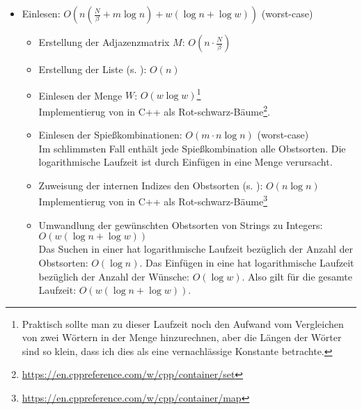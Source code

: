 \begin{itemize}
  \item Einlesen: $O(n (\frac{N}{\beta} + m \log n) + w (\log n + \log w))$ (worst-case)
  \begin{itemize}
    \item Erstellung der Adjazenzmatrix $M$: $O(n \cdot \frac{N}{\beta})$

    \item Erstellung der Liste  (s. ): $O(n)$

    \item Einlesen der Menge $W$: $O(w \log w)$\footnote{Praktisch sollte man zu dieser Laufzeit noch den Aufwand vom Vergleichen von zwei Wörtern in der Menge hinzurechnen, aber die Längen der Wörter sind so klein, dass
     ich dies als eine vernachlässige Konstante betrachte.\label{foot:vergleich-aufwand}}\\
     Implementierug von  in C++ als Rot-schwarz-Bäume\footnote{\href{https://en.cppreference.com/w/cpp/container/set}{https://en.cppreference.com/w/cpp/container/set}}.

    \item Einlesen der Spießkombinationen: $O(m \cdot n \log n)$ (worst-case)\\
    Im schlimmsten Fall enthält jede Spießkombination alle Obstsorten.
    Die logarithmische Laufzeit ist durch Einfügen in eine Menge verursacht.

    \item Zuweisung der internen Indizes den Obstsorten (s. ): $O(n \log n)$\\
     Implementierug von  in C++ als Rot-schwarz-Bäume\footnote{\href{https://en.cppreference.com/w/cpp/container/map}{https://en.cppreference.com/w/cpp/container/map}}

    \item Umwandlung der gewünschten Obstsorten von Strings zu Integers: $O(w (\log n + \log w))$\\%
    Das Suchen in einer  hat logarithmische Laufzeit bezüglich der Anzahl
    der Obstsorten: $O(\log n)$.
    Das Einfügen in eine  hat logarithmische Laufzeit bezüglich der Anzahl
    der Wünsche: $O(\log w)$. Also gilt für die gesamte Laufzeit: $O(w (\log n + \log w))$. 


\end{itemize}
\end{itemize}

